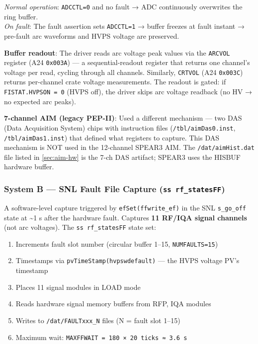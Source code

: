 \emph{Normal operation}: \texttt{ADCCTL=0} and no fault → ADC continuously overwrites the ring buffer.\\
\emph{On fault}: The fault assertion sets \texttt{ADCCTL=1} → buffer freezes at fault instant → pre-fault arc waveforms and HVPS voltage are preserved.

\textbf{Buffer readout}: The driver reads arc voltage peak values via the \texttt{ARCVOL} register (A24 \texttt{0x003A}) --- a sequential-readout register that returns one channel's voltage per read, cycling through all channels. Similarly, \texttt{CRTVOL} (A24 \texttt{0x003C}) returns per-channel crate voltage measurements. The readout is gated: if \texttt{FISTAT.\allowbreak{}HVPSON\ =\ 0} (HVPS off), the driver skips arc voltage readback (no HV → no expected arc peaks).

\begin{keynote}
\textbf{7-channel AIM (legacy PEP-II)}: Used a different mechanism --- two DAS (Data Acquisition System) chips with instruction files (\texttt{/\allowbreak{}tbl/\allowbreak{}aimDas0.\allowbreak{}inst}, \texttt{/\allowbreak{}tbl/\allowbreak{}aimDas1.\allowbreak{}inst}) that defined what registers to capture. This DAS mechanism is NOT used in the 12-channel SPEAR3 AIM. The \texttt{/\allowbreak{}dat/\allowbreak{}aimHist.\allowbreak{}dat} file listed in \cref{sec:aim-hw} is the 7-ch DAS artifact; SPEAR3 uses the HISBUF hardware buffer.
\end{keynote}

\subsubsection{\texorpdfstring{System B --- SNL Fault File Capture (\texttt{ss\ rf\_\allowbreak{}statesFF})}{System B --- SNL Fault File Capture (ss rf\_statesFF)}}\label{sec:aim-snl-files}


A software-level capture triggered by \texttt{efSet(ffwrite\_\allowbreak{}ef)} in the SNL \texttt{s\_go\_off} state at \textasciitilde1 s after the hardware fault. Captures \textbf{11 RF/IQA signal channels} (not arc voltages). The \texttt{ss\ rf\_\allowbreak{}statesFF} state set:

\begin{enumerate}
\def\labelenumi{\arabic{enumi}.}
\tightlist
\item
  Increments fault slot number (circular buffer 1--15, \texttt{NUMFAULTS=15})
\item
  Timestamps via \texttt{pvTimeStamp(hvpswdefault)} --- the HVPS voltage PV's timestamp
\item
  Places 11 signal modules in LOAD mode
\item
  Reads hardware signal memory buffers from RFP, IQA modules
\item
  Writes to \texttt{/\allowbreak{}dat/\allowbreak{}FAULTxxx\_\allowbreak{}N} files (N = fault slot 1--15)
\item
  Maximum wait: \texttt{MAXFFWAIT\ =\ 180\ ×\ 20\ ticks\ ≈\ 3.\allowbreak{}6\ s}
\end{enumerate}

